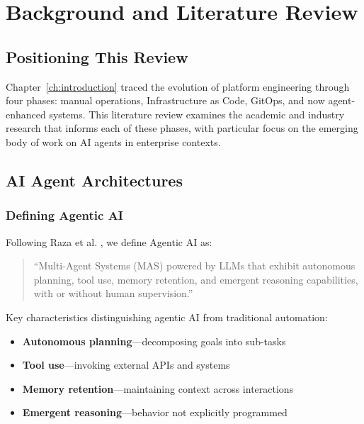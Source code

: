 \chapter{Background and Literature Review}
\label{ch:literature-review}


\section{Positioning This Review}
\label{sec:positioning-review}

Chapter~\ref{ch:introduction} traced the evolution of platform engineering through four phases: manual operations, Infrastructure as Code, GitOps, and now agent-enhanced systems. This literature review examines the academic and industry research that informs each of these phases, with particular focus on the emerging body of work on AI agents in enterprise contexts.

\section{AI Agent Architectures}
\label{sec:agent-architectures}

\subsection{Defining Agentic AI}
\label{subsec:defining-agentic-ai}

Following Raza et al. \citep{raza2025}, we define Agentic AI as:

\begin{quote}
``Multi-Agent Systems (MAS) powered by LLMs that exhibit autonomous planning, tool use, memory retention, and emergent reasoning capabilities, with or without human supervision.''
\end{quote}

Key characteristics distinguishing agentic AI from traditional automation:
\begin{itemize}
    \item \textbf{Autonomous planning}---decomposing goals into sub-tasks
    \item \textbf{Tool use}---invoking external APIs and systems
    \item \textbf{Memory retention}---maintaining context across interactions
    \item \textbf{Emergent reasoning}---behavior not explicitly programmed
\end{itemize}

